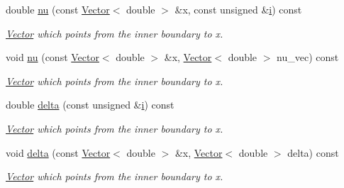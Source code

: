 \begin{DoxyCompactItemize}
double \hyperlink{classoomph_1_1AxisAlignedPMLElement_a554c5768cdf2543b76a507dacd7fe54b}{nu} (const \hyperlink{classoomph_1_1Vector}{Vector}$<$ double $>$ \&x, const unsigned \&\hyperlink{cfortran_8h_adb50e893b86b3e55e751a42eab3cba82}{i}) const
\begin{DoxyCompactList}\small\item\em \hyperlink{classoomph_1_1Vector}{Vector} which points from the inner boundary to x. \end{DoxyCompactList}\item 
void \hyperlink{classoomph_1_1AxisAlignedPMLElement_ae278a54184e8134f57aa361bfc1cc975}{nu} (const \hyperlink{classoomph_1_1Vector}{Vector}$<$ double $>$ \&x, \hyperlink{classoomph_1_1Vector}{Vector}$<$ double $>$ nu\+\_\+vec) const
\begin{DoxyCompactList}\small\item\em \hyperlink{classoomph_1_1Vector}{Vector} which points from the inner boundary to x. \end{DoxyCompactList}\item 
double \hyperlink{classoomph_1_1AxisAlignedPMLElement_af5689e98392072da121eafa0b438e44c}{delta} (const unsigned \&\hyperlink{cfortran_8h_adb50e893b86b3e55e751a42eab3cba82}{i}) const
\begin{DoxyCompactList}\small\item\em \hyperlink{classoomph_1_1Vector}{Vector} which points from the inner boundary to x. \end{DoxyCompactList}\item 
void \hyperlink{classoomph_1_1AxisAlignedPMLElement_a37d292c06ab74db30dcb6e8f7cea4033}{delta} (const \hyperlink{classoomph_1_1Vector}{Vector}$<$ double $>$ \&x, \hyperlink{classoomph_1_1Vector}{Vector}$<$ double $>$ delta) const
\begin{DoxyCompactList}\small\item\em \hyperlink{classoomph_1_1Vector}{Vector} which points from the inner boundary to x. \end{DoxyCompactList}\end{DoxyCompactItemize}
